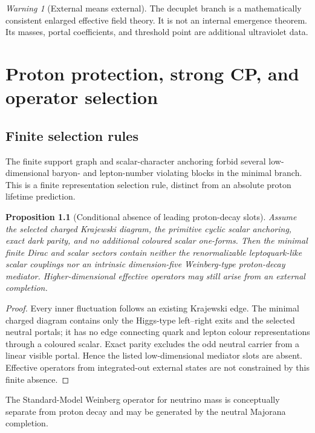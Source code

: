 \documentclass[11pt,oneside,openany]{book}
\numberwithin{equation}{chapter}
\newtheorem{proposition}[theorem]{Proposition}
\theoremstyle{definition}
\theoremstyle{remark}
\newtheorem{warning}[theorem]{Warning}
\begin{document}
\begin{warning}[External means external]
The decuplet branch is a mathematically consistent enlarged effective field theory.  It is not an internal emergence theorem.  Its masses, portal coefficients, and threshold point are additional ultraviolet data.
\end{warning}

\chapter{Proton protection, strong CP, and operator selection}
\label{ch:proton}

\section{Finite selection rules}
The finite support graph and scalar-character anchoring forbid several low-dimensional baryon- and lepton-number violating blocks in the minimal branch.  This is a finite representation selection rule, distinct from an absolute proton lifetime prediction.

\begin{proposition}[Conditional absence of leading proton-decay slots]
\label{prop:proton-selection}
Assume the selected charged Krajewski diagram, the primitive cyclic scalar anchoring, exact dark parity, and no additional coloured scalar one-forms.  Then the minimal finite Dirac and scalar sectors contain neither the renormalizable leptoquark-like scalar couplings nor an intrinsic dimension-five Weinberg-type proton-decay mediator.  Higher-dimensional effective operators may still arise from an external completion.
\end{proposition}

\begin{proof}
Every inner fluctuation follows an existing Krajewski edge.  The minimal charged diagram contains only the Higgs-type left--right exits and the selected neutral portals; it has no edge connecting quark and lepton colour representations through a coloured scalar.  Exact parity excludes the odd neutral carrier from a linear visible portal.  Hence the listed low-dimensional mediator slots are absent.  Effective operators from integrated-out external states are not constrained by this finite absence.
\end{proof}

The Standard-Model Weinberg operator for neutrino mass \cite{Weinberg1979} is conceptually separate from proton decay and may be generated by the neutral Majorana completion.
\end{document}

